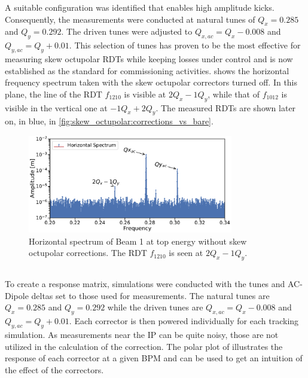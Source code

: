 A suitable configuration was identified that enables high amplitude kicks. Consequently, the
measurements were conducted at natural tunes of $Q_x = 0.285$ and $Q_y = 0.292$. The driven
tunes were adjusted to $Q_{x,ac} = Q_x -0.008$ and $Q_{y,ac} = Q_y + 0.01$. This selection of tunes
has proven to be the most effective for measuring skew octupolar RDTs while keeping losses under
control and is now established as the standard for commissioning activities.
 shows the horizontal frequency spectrum taken
with the skew octupolar correctors turned off. In this plane, the line of the RDT $f_{1210}$ is
visible at $2Q_x - 1Q_y$, while that of $f_{1012}$ is visible in the vertical one at $-1Q_x + 2Q_y$.
The measured RDTs are shown later on, in blue, in \cref{fig:skew_octupolar:corrections_vs_bare}.

\begin{figure}[!htb]
    \centering
    \includegraphics[width=0.8\textwidth]{./images/spectrum_a4_top_energy.pdf}
    \caption{Horizontal spectrum of Beam 1 at top energy without skew octupolar corrections. The RDT
    $f_{1210}$ is seen at $2Q_x - 1Q_y$.}
    \label{fig:skew_octupolar:spectrum_a4_top_energy}
\end{figure}




\subsection{}

To create a response matrix, simulations were conducted with the tunes and AC-Dipole deltas set to
those used for measurements. The natural tunes are $Q_x = 0.285$ and $Q_y = 0.292$ while the driven
tunes are $Q_{x,ac} = Q_x -0.008$ and $Q_{y,ac} = Q_y + 0.01$. Each corrector is then powered
individually for each tracking simulation. As measurements near the IP can be quite noisy, those are
not utilized in the calculation of the correction. The polar plot of
 illustrates the response of each corrector at a
given BPM and can be used to get an intuition of the effect of the correctors.

